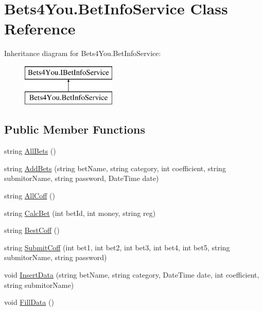 \hypertarget{class_bets4_you_1_1_bet_info_service}{}\section{Bets4\+You.\+Bet\+Info\+Service Class Reference}
\label{class_bets4_you_1_1_bet_info_service}
Inheritance diagram for Bets4\+You.\+Bet\+Info\+Service\+:\begin{figure}[H]
\begin{center}
\leavevmode
\includegraphics[height=2.000000cm]{class_bets4_you_1_1_bet_info_service}
\end{center}
\end{figure}
\subsection*{Public Member Functions}
\begin{DoxyCompactItemize}
\item 
string \mbox{\hyperlink{class_bets4_you_1_1_bet_info_service_a911a79019d2aa6dc66aa4c14c6d3d500}{All\+Bets}} ()
\item 
string \mbox{\hyperlink{class_bets4_you_1_1_bet_info_service_a7e982447a6e04dcc798edef35ac73e43}{Add\+Bets}} (string bet\+Name, string category, int coefficient, string submitor\+Name, string password, Date\+Time date)
\item 
string \mbox{\hyperlink{class_bets4_you_1_1_bet_info_service_a3df2201fec0a81c97b362f3e7cb90577}{All\+Coff}} ()
\item 
string \mbox{\hyperlink{class_bets4_you_1_1_bet_info_service_aedba79801c5395db599f761241964617}{Calc\+Bet}} (int bet\+Id, int money, string reg)
\item 
string \mbox{\hyperlink{class_bets4_you_1_1_bet_info_service_aa61e540cfbd81810e011755534d6db05}{Best\+Coff}} ()
\item 
string \mbox{\hyperlink{class_bets4_you_1_1_bet_info_service_a743f5c2955670ff7965a5bebce053be9}{Submit\+Coff}} (int bet1, int bet2, int bet3, int bet4, int bet5, string submitor\+Name, string password)
\item 
void \mbox{\hyperlink{class_bets4_you_1_1_bet_info_service_a79ead73bbe8e74034d5002f4d64ced32}{Insert\+Data}} (string bet\+Name, string category, Date\+Time date, int coefficient, string submitor\+Name)
\item 
void \mbox{\hyperlink{class_bets4_you_1_1_bet_info_service_abdb26d3de0f10a237d7bebec509e9e1e}{Fill\+Data}} ()
\end{DoxyCompactItemize}


